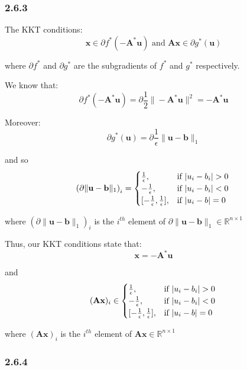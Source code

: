 \documentclass[12pt]{article}
\begin{document}
\subsubsection*{2.6.3}

The KKT conditions:
\[\textbf{x} \in \partial f^*(-\textbf{A}^*\textbf{u}) \text{ and } \textbf{Ax} \in \partial g^*(\textbf{u})\]

where $\partial f^*$ and $\partial g^*$ are the subgradients of $f^*$ and $g^*$ respectively.

We know that:
\[\partial f^*(-\textbf{A}^*\textbf{u}) = \partial \frac{1}{2}\|-\textbf{A}^*\textbf{u}\|^2 = -\textbf{A}^*\textbf{u}\]

Moreover:
\[\partial g^*(\textbf{u}) = \partial\frac{1}{\epsilon} \| \textbf{u} - \textbf{b}\|_1 \]

and so
\[\left(\partial\| \textbf{u} - \textbf{b}\|_1\right)_i = \begin{cases}
      \frac{1}{\epsilon}, &  \text{if } | u_i - b_i| > 0 \\
      -\frac{1}{\epsilon}, &  \text{if } | u_i - b_i| < 0 \\
      [-\frac{1}{\epsilon}, \frac{1}{\epsilon}], &  \text{if } | u_i - b| = 0 \\
   \end{cases} \\
\]

where $\left(\partial\| \textbf{u} - \textbf{b}\|_1\right)_i$ is the $i^{th}$ element of $\partial\| \textbf{u} - \textbf{b}\|_1 \in \mathbb{R}^{n \times 1}$

Thus, our KKT conditions state that:
\[\textbf{x} = -\textbf{A}^*\textbf{u}\]

and
\[(\textbf{Ax})_i \in \begin{cases}
      \frac{1}{\epsilon}, &  \text{if } | u_i - b_i| > 0 \\
      -\frac{1}{\epsilon}, &  \text{if } | u_i - b_i| < 0 \\
      [-\frac{1}{\epsilon}, \frac{1}{\epsilon}], &  \text{if } | u_i - b| = 0 \\
   \end{cases} \\\]

where $(\textbf{Ax})_i$ is the $i^{th}$ element of $\textbf{Ax}\in \mathbb{R}^{n \times 1}$

\subsubsection*{2.6.4}
\end{document}
